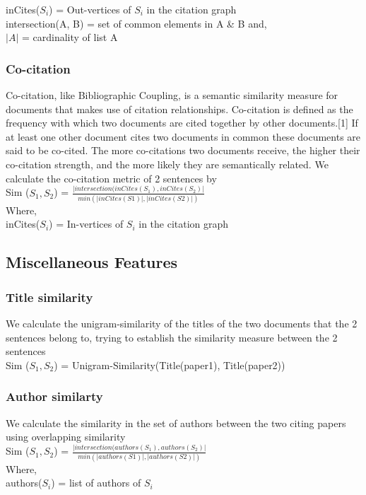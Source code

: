 inCites($S_i$) = Out-vertices of $S_i$ in the citation graph \\
intersection(A, B) = set of common elements in A \& B and, \\
$\lvert A \rvert$ = cardinality of list A

\subsubsection{Co-citation} 
Co-citation, like Bibliographic Coupling, is a semantic similarity measure for documents that makes use of citation relationships. Co-citation is defined as the frequency with which two documents are cited together by other documents.[1] If at least one other document cites two documents in common these documents are said to be co-cited. The more co-citations two documents receive, the higher their co-citation strength, and the more likely they are semantically related. We calculate the co-citation metric of 2 sentences by \\

Sim ($S_1, S_2$) = $ \frac{ \lvert intersection(inCites(S_1), inCites(S_2) \rvert}{ min ( \lvert inCites(S1) \rvert, \lvert inCites(S2) \rvert )}$ \\
Where, \\
inCites($S_i$) = In-vertices of $S_i$ in the citation graph

\subsection{Miscellaneous Features}

\subsubsection{Title similarity}
We calculate the unigram-similarity of the titles of the two documents that the 2 sentences belong to,  trying to establish the similarity measure between the 2 sentences \\
Sim ($S_1, S_2$) = Unigram-Similarity(Title(paper1), Title(paper2))

\subsubsection{Author similarty} 
We calculate the similarity in the set of authors between the two citing papers using overlapping similarity \\ 
Sim ($S_1, S_2$) = $\frac{\lvert intersection(authors(S_1), authors(S_2) \rvert}{  min ( \lvert authors(S1)\rvert, \lvert authors(S2) \rvert ) }$ \\
Where, \\
authors($S_i$) = list of authors of $S_i$

